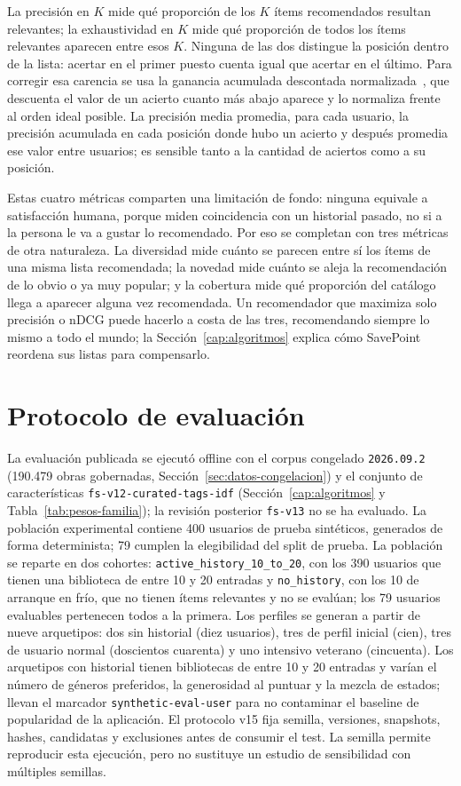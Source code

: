 La precisión en \(K\) mide qué proporción de los \(K\) ítems recomendados resultan relevantes;
la exhaustividad en \(K\) mide qué proporción de todos los ítems relevantes aparecen entre
esos \(K\). Ninguna de las dos distingue la posición dentro de la lista: acertar en el primer
puesto cuenta igual que acertar en el último. Para corregir esa carencia se usa la ganancia
acumulada descontada normalizada~\cite{jarvelin2002cumulated}, que descuenta el valor
de un acierto cuanto más abajo aparece y lo normaliza frente al orden ideal posible. La
precisión media promedia, para cada usuario, la precisión acumulada en cada posición
donde hubo un acierto y después promedia ese valor entre usuarios; es sensible tanto a la
cantidad de aciertos como a su posición.

Estas cuatro métricas comparten una limitación de fondo: ninguna equivale a satisfacción
humana, porque miden coincidencia con un historial pasado, no si a la persona le va a gustar lo
recomendado. Por eso se completan con tres métricas de otra naturaleza. La diversidad mide
cuánto se parecen entre sí los ítems de una misma lista recomendada; la novedad mide cuánto se
aleja la recomendación de lo obvio o ya muy popular; y la cobertura mide qué proporción del
catálogo llega a aparecer alguna vez recomendada. Un recomendador que maximiza solo precisión
o nDCG puede hacerlo a costa de las tres, recomendando siempre lo mismo a todo el mundo; la
Sección~\ref{cap:algoritmos} explica cómo SavePoint reordena sus listas para compensarlo.

\section{Protocolo de evaluación}\label{sec:exp-protocolo}

La evaluación publicada se ejecutó offline con el corpus congelado \texttt{2026.09.2} (190.479 obras
gobernadas, Sección~\ref{sec:datos-congelacion}) y el conjunto de
características \texttt{fs-v12-curated-tags-idf} (Sección~\ref{cap:algoritmos} y
Tabla~\ref{tab:pesos-familia}); la revisión posterior \texttt{fs-v13} no se ha evaluado. La población experimental contiene 400 usuarios de prueba sintéticos, generados de forma determinista; 79 cumplen la elegibilidad del split de prueba. La población se reparte en dos cohortes: \texttt{active\_history\_10\_to\_20}, con los 390 usuarios que tienen una biblioteca de entre 10 y 20 entradas y \texttt{no\_history}, con los 10 de arranque en frío, que no tienen ítems relevantes y no se evalúan; los 79 usuarios evaluables pertenecen todos a la primera. Los perfiles se generan a partir de nueve arquetipos: dos sin historial (diez usuarios), tres de perfil inicial (cien), tres de usuario normal (doscientos cuarenta) y uno intensivo veterano (cincuenta). Los arquetipos con historial tienen bibliotecas de entre 10 y 20 entradas y varían el número de géneros preferidos, la generosidad al puntuar y la mezcla de estados; llevan el marcador \texttt{synthetic-eval-user} para no contaminar el baseline de popularidad de la aplicación. El protocolo v15 fija semilla, versiones, snapshots, hashes, candidatas y exclusiones antes de consumir el test. La semilla permite reproducir esta ejecución, pero no sustituye un estudio de sensibilidad con múltiples semillas.

